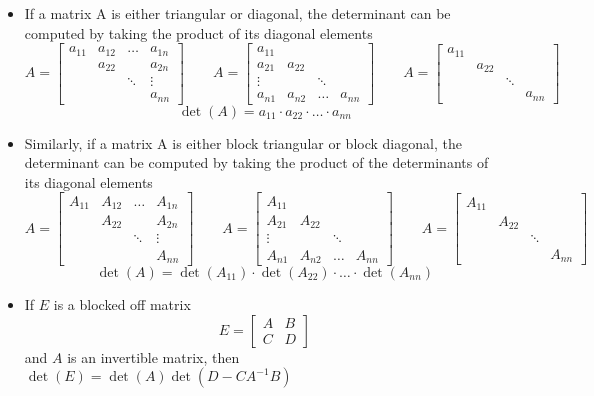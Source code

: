 \documentclass{report}
\begin{document}
\begin{itemize}
\item If a matrix A is either triangular or diagonal, the determinant can be computed by taking the product of its diagonal elements
$$
A = \begin{bmatrix}
a_{11} & a_{12} & \ldots & a_{1n} \\
& a_{22} & & a_{2n} \\
& & \ddots &  \vdots \\
& & & a_{nn} \end{bmatrix} \qquad
A = \begin{bmatrix}
a_{11} & & &  \\
a_{21} & a_{22} & & \\
\vdots & & \ddots & \\
a_{n1} & a_{n2} &  \ldots & a_{nn}
\end{bmatrix} \qquad
A = \begin{bmatrix}
a_{11} & & & \\
& a_{22} & & \\
& & \ddots & \\
& & & a_{nn}
\end{bmatrix}
$$
$$
\operatorname{det}(A) = a_{11} \cdot a_{22} \cdot \ldots \cdot a_{nn}
$$
\item Similarly,  if a matrix A is either block triangular or block diagonal, the determinant can be computed by taking the product of the determinants of its diagonal elements
$$
A = \begin{bmatrix}
A_{11} & A_{12} & \ldots & A_{1n} \\
& A_{22} & & A_{2n} \\
& & \ddots & \vdots \\
& & & A_{nn}
\end{bmatrix}\qquad
A = \begin{bmatrix}
A_{11}&&&\\
A_{21}&A_{22}&&\\
\vdots&&\ddots&\\
A_{n1}&A_{n2}&\ldots&A_{nn}
\end{bmatrix}\qquad
A = \begin{bmatrix}
A_{11}&&&\\
&A_{22}&&\\
&&\ddots&\\
&&&A_{nn}
\end{bmatrix}
$$
$$
\operatorname{det}(A) = \operatorname{det}(A_{11}) \cdot \operatorname{det}(A_{22}) \cdot \ldots \cdot \operatorname{det}(A_{nn})
$$
\item If $E$ is a blocked off matrix
$$
E = \begin{bmatrix}
A & B \\ C & D
\end{bmatrix}
$$
and $A$ is an invertible matrix,  then $\det(E)=\det(A)\det(D-CA^{-1}B)$
\end{itemize}
\end{document}
